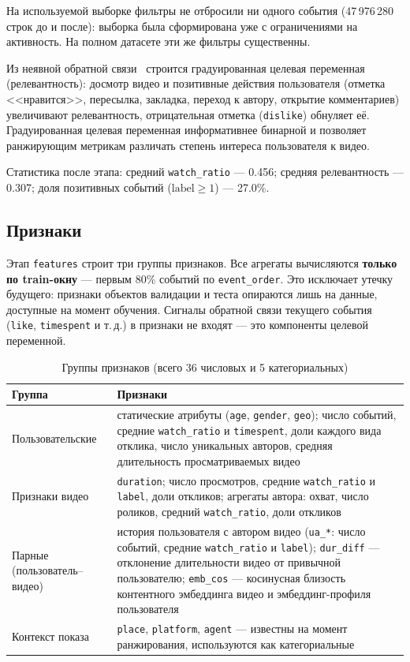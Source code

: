 На используемой выборке фильтры не отбросили ни одного события (47\,976\,280 строк до и после): выборка была сформирована уже с ограничениями на активность.
На полном датасете эти же фильтры существенны.

Из неявной обратной связи~\cite{implicit-cf} строится градуированная целевая переменная (релевантность): досмотр видео и позитивные действия пользователя (отметка <<нравится>>, пересылка, закладка, переход к автору, открытие комментариев) увеличивают релевантность, отрицательная отметка (\texttt{dislike}) обнуляет её.
Градуированная целевая переменная информативнее бинарной и позволяет ранжирующим метрикам различать степень интереса пользователя к видео.

Статистика после этапа: средний \texttt{watch\_ratio} --- 0.456; средняя релевантность --- 0.307; доля позитивных событий ($\text{label} \ge 1$) --- 27.0\%.

\subsection{Признаки}

Этап \texttt{features} строит три группы признаков.
Все агрегаты вычисляются \textbf{только по train-окну} --- первым 80\% событий по \texttt{event\_order}.
Это исключает утечку будущего: признаки объектов валидации и теста опираются лишь на данные, доступные на момент обучения.
Сигналы обратной связи текущего события (\texttt{like}, \texttt{timespent} и т.\,д.) в признаки не входят --- это компоненты целевой переменной.

\begin{table}[H]
\centering
\caption{Группы признаков (всего 36 числовых и 5 категориальных)}
\label{tab:features}
\small
\begin{tabularx}{\textwidth}{@{}l X@{}}
\toprule
\textbf{Группа} & \textbf{Признаки} \\
\midrule
Пользовательские & статические атрибуты (\texttt{age}, \texttt{gender}, \texttt{geo}); число событий, средние \texttt{watch\_ratio} и \texttt{timespent}, доли каждого вида отклика, число уникальных авторов, средняя длительность просматриваемых видео \\
Признаки видео & \texttt{duration}; число просмотров, средние \texttt{watch\_ratio} и \texttt{label}, доли откликов; агрегаты автора: охват, число роликов, средний \texttt{watch\_ratio}, доли откликов \\
Парные (пользователь--видео) & история пользователя с автором видео (\texttt{ua\_*}: число событий, средние \texttt{watch\_ratio} и \texttt{label}); \texttt{dur\_diff} --- отклонение длительности видео от привычной пользователю; \texttt{emb\_cos} --- косинусная близость контентного эмбеддинга видео и эмбеддинг-профиля пользователя \\
Контекст показа & \texttt{place}, \texttt{platform}, \texttt{agent} --- известны на момент ранжирования, используются как категориальные \\
\bottomrule
\end{tabularx}
\end{table}

